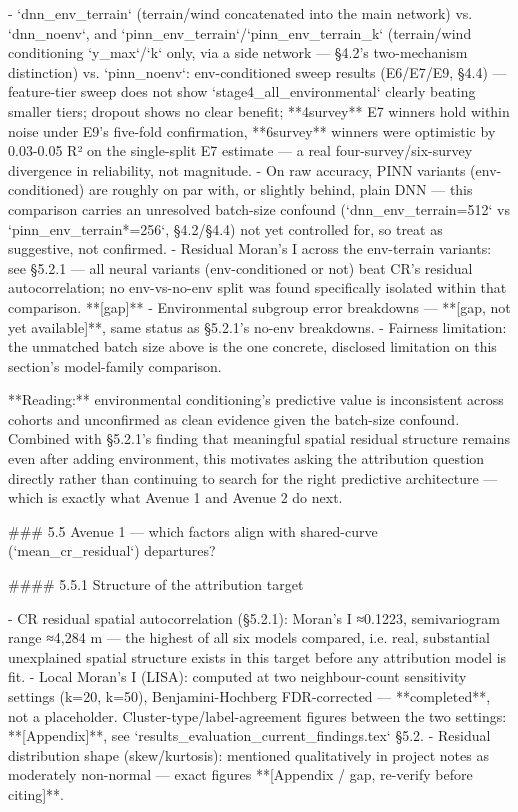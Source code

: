 - `dnn_env_terrain` (terrain/wind concatenated into the main network) vs. `dnn_noenv`, and `pinn_env_terrain`/`pinn_env_terrain_k` (terrain/wind conditioning `y_max`/`k` only, via a side network — §4.2's two-mechanism distinction) vs. `pinn_noenv`: env-conditioned sweep results (E6/E7/E9, §4.4) — feature-tier sweep does not show `stage4_all_environmental` clearly beating smaller tiers; dropout shows no clear benefit; **4survey** E7 winners hold within noise under E9's five-fold confirmation, **6survey** winners were optimistic by 0.03-0.05 R² on the single-split E7 estimate — a real four-survey/six-survey divergence in reliability, not magnitude.
- On raw accuracy, PINN variants (env-conditioned) are roughly on par with, or slightly behind, plain DNN — this comparison carries an unresolved batch-size confound (`dnn_env_terrain=512` vs `pinn_env_terrain*=256`, §4.2/§4.4) not yet controlled for, so treat as suggestive, not confirmed.
- Residual Moran's I across the env-terrain variants: see §5.2.1 — all neural variants (env-conditioned or not) beat CR's residual autocorrelation; no env-vs-no-env split was found specifically isolated within that comparison. **[gap]**
- Environmental subgroup error breakdowns — **[gap, not yet available]**, same status as §5.2.1's no-env breakdowns.
- Fairness limitation: the unmatched batch size above is the one concrete, disclosed limitation on this section's model-family comparison.

**Reading:** environmental conditioning's predictive value is inconsistent across cohorts and unconfirmed as clean evidence given the batch-size confound. Combined with §5.2.1's finding that meaningful spatial residual structure remains even after adding environment, this motivates asking the attribution question directly rather than continuing to search for the right predictive architecture — which is exactly what Avenue 1 and Avenue 2 do next.

### 5.5 Avenue 1 — which factors align with shared-curve (`mean_cr_residual`) departures?

#### 5.5.1 Structure of the attribution target

- CR residual spatial autocorrelation (§5.2.1): Moran's I ≈0.1223, semivariogram range ≈4,284 m — the highest of all six models compared, i.e. real, substantial unexplained spatial structure exists in this target before any attribution model is fit.
- Local Moran's I (LISA): computed at two neighbour-count sensitivity settings (k=20, k=50), Benjamini-Hochberg FDR-corrected — **completed**, not a placeholder. Cluster-type/label-agreement figures between the two settings: **[Appendix]**, see `results_evaluation_current_findings.tex` §5.2.
- Residual distribution shape (skew/kurtosis): mentioned qualitatively in project notes as moderately non-normal — exact figures **[Appendix / gap, re-verify before citing]**.

